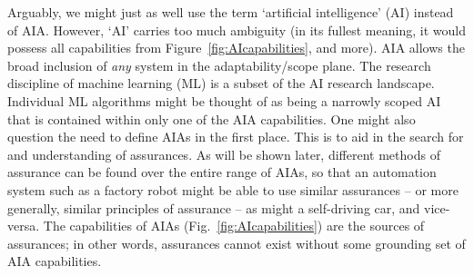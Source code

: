 Arguably, we might just as well use the term `artificial intelligence' (AI) instead of AIA. However, `AI' carries too much ambiguity (in its fullest meaning, it would possess all capabilities from Figure~\ref{fig:AIcapabilities}, and more). AIA allows the broad inclusion of \emph{any} system in the adaptability/scope plane. %
The research discipline of machine learning (ML) is a subset of the AI research landscape. Individual ML algorithms might be thought of as being a narrowly scoped AI that is contained within only one of the AIA capabilities. 
%
One might also question the need to define AIAs in the first place. This is to aid in the search for and understanding of assurances. As will be shown later, different methods of assurance can be found over the entire range of AIAs, so that an automation system such as a factory robot %
might be able to use similar assurances -- or more generally, similar principles of assurance -- as might a self-driving car, and vice-versa. The capabilities of AIAs (Fig.~\ref{fig:AIcapabilities}) are the sources of assurances; in other words, assurances cannot exist without some grounding set of AIA capabilities. 

